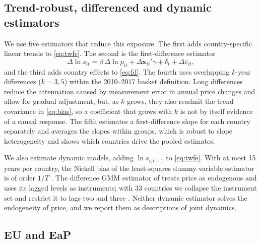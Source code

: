 \documentclass[pdflatex,sn-basic]{sn-jnl}
\begin{document}
\subsection{Trend-robust, differenced and dynamic estimators}

We use five estimators that reduce this exposure. The first adds country-specific linear trends to \eqref{eq:twfe}. The second is the first-difference estimator
\begin{equation}\label{eq:fd}
\Delta \ln s_{it} = \beta \,\Delta \ln p_{it} + \Delta \mathbf{x}_{it}'\gamma + \delta_t + \Delta\varepsilon_{it},
\end{equation}
and the third adds country effects to \eqref{eq:fd}. The fourth uses overlapping $k$-year differences ($k=3,5$) within the 2010--2017 basket definition. Long differences reduce the attenuation caused by measurement error in annual price changes and allow for gradual adjustment, but, as $k$ grows, they also readmit the trend covariance in \eqref{eq:bias}, so a coefficient that grows with $k$ is not by itself evidence of a causal response. The fifth estimates a first-difference slope for each country separately and averages the slopes within groups, which is robust to slope heterogeneity \citep{pesaran1995estimating,blomquist2015panel} and shows which countries drive the pooled estimates.

We also estimate dynamic models, adding $\ln s_{i,t-1}$ to \eqref{eq:twfe}. With at most 15 years per country, the Nickell bias of the least-squares dummy-variable estimator is of order $1/T$ \citep{nickell1981biases}. The difference GMM estimator of \citet{arellano1991some} treats price as endogenous and uses its lagged levels as instruments; with 33 countries we collapse the instrument set and restrict it to lags two and three \citep{roodman2009note}. Neither dynamic estimator solves the endogeneity of price, and we report them as descriptions of joint dynamics.

\subsection{EU and EaP}
\end{document}
